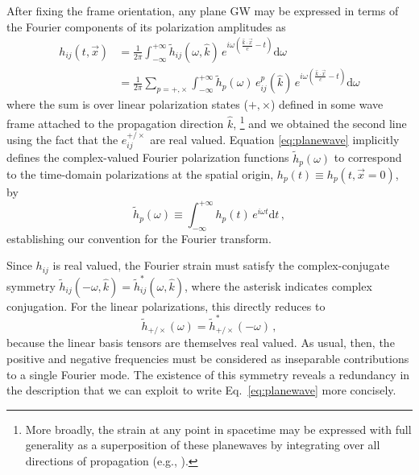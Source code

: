 \documentclass[aps,prd,twocolumn,superscriptaddress,preprintnumbers,floatfix,nofootinbib]{revtex4-2}
\newcommand{\beq}{\begin{equation}}
\newcommand{\eeq}{\end{equation}}
\newcommand{\infd}{\mathrm{d}}
\begin{document}
After fixing the frame orientation, any plane GW may be expressed in terms of the Fourier components of its polarization amplitudes as
\begin{align}
\label{eq:planewave}
h_{ij}(t,\vec{x}) &= \frac{1}{2\pi}\int_{-\infty}^{+\infty} \tilde{h}_{ij}(\omega, \hat{k})\, e^{i\omega \left(\frac{\hat{k}\cdot\vec{x}}{c}-t\right)} \infd \omega \\
&= \frac{1}{2\pi} \sum_{p=+,\times} \int_{-\infty}^{+\infty} \tilde{h}_p(\omega)\, e^p_{ij}(\hat{k})\, e^{i\omega \left(\frac{\hat{k}\cdot\vec{x}}{c}-t\right)} \infd \omega \nonumber
\end{align}
where the sum is over linear polarization states ($+,\times$) defined in some wave frame attached to the propagation direction $\hat{k}$,%
\footnote{More broadly, the strain at any point in spacetime may be expressed with full generality as a superposition of these planewaves
by integrating over all directions of propagation (e.g., \cite{Romano:2016dpx,Isi:2018miq}).}
and we obtained the second line using the fact that the $e^{+/\times}_{ij}$ are real valued.
Equation \eqref{eq:planewave} implicitly defines the complex-valued Fourier polarization functions $\tilde{h}_p(\omega)$ to correspond to the time-domain polarizations at the spatial origin, $h_p(t) \equiv h_p(t, \vec{x}=0)$, by
\beq \label{eq:ft}
\tilde{h}_p(\omega) \equiv \int_{-\infty}^{+\infty} h_p(t)\, e^{i\omega t} \infd t \, ,
\eeq
establishing our convention for the Fourier transform.

Since $h_{ij}$ is real valued, the Fourier strain must  satisfy the complex-conjugate symmetry $\tilde{h}_{ij}(-\omega, \hat{k}) = \tilde{h}_{ij}^*(\omega,\hat{k})$, where the asterisk indicates complex conjugation.
For the linear polarizations, this directly reduces to
\beq \label{eq:sym_linear}
\tilde{h}_{+/\times}(\omega) = \tilde{h}_{+/\times}^*(-\omega)\, ,
\eeq
because the linear basis tensors are themselves real valued.
As usual, then, the positive and negative frequencies must be considered as inseparable contributions to a single Fourier mode.
The existence of this symmetry reveals a redundancy in the description that we can exploit to write Eq.~\eqref{eq:planewave} more concisely.
\end{document}
